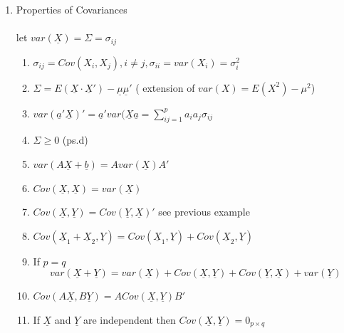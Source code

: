 \documentclass[11pt,a4paper]{article}
\theoremstyle{definition}
\begin{document}
\begin{enumerate}
\item[(C).] Properties of Covariances\\\\

let $var(\underline{X})=\displaystyle{\Sigma}= \sigma_{ij}$
\begin{enumerate}
\item $\sigma_{ij} = Cov(X_i,X_j),  i\neq j,  \sigma_{ii} = var(X_i) = \sigma_i^2$\\

\item $\displaystyle{\Sigma} = E(\underline{X}\cdot\underline{X}')-\underline{\mu}\underline{\mu}'$ ( extension of  $var(X) = E(X^2)- \mu^2$)\\

\item $\displaystyle{var(\underline{a}'\underline{X})'= \underline{a}' var(\underline{X} \underline{a} = \sum^p_{ij=1}a_ia_j\sigma_{ij}}$\\

\item $\displaystyle{\Sigma \geq 0}$ (ps.d)\\

\item $var(A\underline{X} + \underline{b}) = A var(\underline{X}) A'$\\

\item $ Cov(\underline{X}, \underline{X}) = var(\underline{X})$\\

\item $Cov(\underline{X}, \underline{Y}) = Cov( \underline{Y}, \underline{X})'$ see previous example\\

\item $Cov(\underline{X}_1 + \underline{X}_2, \underline{Y}) = Cov(\underline{X}_1, \underline{Y}) + Cov(\underline{X}_2,\underline{Y})$\\

\item If $p=q$ $$var(\underline{X}+ \underline{Y}) = var(\underline{X}) + Cov(\underline{X},\underline{Y}) + Cov(\underline{Y}, \underline{X}) + var(\underline{Y})$$

\item $Cov(A\underline{X},B\underline{Y}) = A Cov ( \underline{X},\underline{Y})B'$\\

\item If $\underline{X}$ and $\underline{Y}$ are independent then $Cov(\underline{X},\underline{Y}) = 0_{p\times q}$\\\\
\end{enumerate}
\end{enumerate}
\end{document}
